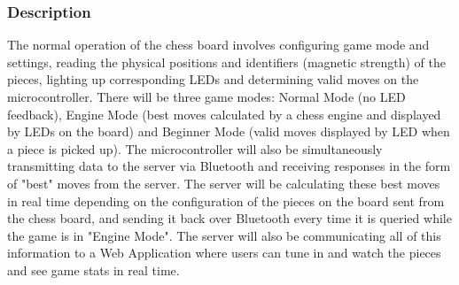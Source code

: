 \documentclass[12pt]{article}
\begin{document}
\subsubsection{Description}{
    The normal operation of the chess board involves configuring game mode and settings, reading the physical positions and identifiers (magnetic strength) of the pieces, 
    lighting up corresponding LEDs and determining valid moves on the microcontroller. There will be three game modes: Normal Mode (no LED feedback), Engine Mode (best moves 
    calculated by a chess engine and displayed by LEDs on the board) and Beginner Mode (valid moves displayed by LED when a piece is picked up). The microcontroller will also be 
    simultaneously transmitting data to the server via Bluetooth and receiving responses in the form of "best" moves from the server. The server will be calculating these 
    best moves in real time depending on the configuration of the pieces on the board sent from the chess board, and sending it back over Bluetooth every time it is queried
    while the game is in "Engine Mode". The server will also be communicating all of this information to a Web Application where users can tune in and watch the pieces and see
    game stats in real time.
}
\end{document}
